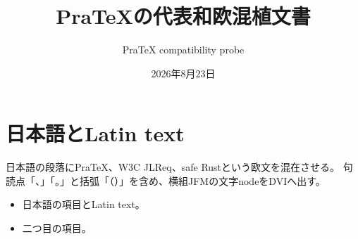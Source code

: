 \documentclass[a4paper,10pt]{prjsarticle}
\title{PraTeXの代表和欧混植文書}
\author{PraTeX compatibility probe}
\date{2026年8月23日}
\begin{document}
\maketitle

\section{日本語とLatin text}
日本語の段落にPraTeX、W3C JLReq、safe Rustという欧文を混在させる。
句読点「、」「。」と括弧「（）」を含め、横組JFMの文字nodeをDVIへ出す。

\begin{itemize}
  \item 日本語の項目とLatin text。
  \item 二つ目の項目。
\end{itemize}
\end{document}
